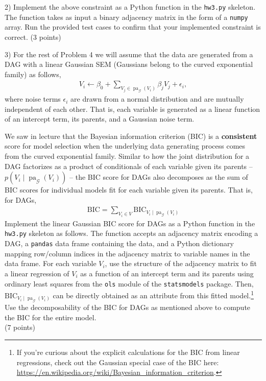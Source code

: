 \documentclass[letterpaper, 11pt]{article}
\DeclareMathOperator{\pa}{pa}
\newcommand{\G}{\mathcal{G}}
\begin{document}
2) Implement the above constraint as a Python function in the \texttt{hw3.py} skeleton. The function takes as input a binary adjacency matrix in the form of a \texttt{numpy} array. Run the provided test cases to confirm that your implemented constraint is correct. (3 points)

3) For the rest of Problem 4 we will assume that the data are generated from a DAG with a linear Gaussian SEM (Gaussians belong to the curved exponential family) as follows,
\begin{align*}
V_i \gets \beta_0 + \sum_{V_j \in \pa_\G(V_i)} \beta_j V_j + \epsilon_i,
\end{align*}
where noise terms $\epsilon_i$ are drawn from a normal distribution and are mutually independent of each other. That is, each variable is generated as a linear function of an intercept term, its parents, and a Gaussian noise term.

We saw in lecture that the Bayesian information criterion (BIC) is a \textbf{consistent} score for model selection when the underlying data generating process comes from the curved exponential family. Similar to how the joint distribution for a DAG factorizes as a product of conditionals of each variable given its parents -- $p(V_i \mid \pa_\G(V_i))$ -- the BIC score for DAGs also decomposes as the sum of BIC scores for individual models fit for each variable given its parents. That is, for DAGs,
\begin{align*}
\text{BIC} = \sum_{V_i \in V} \text{BIC}_{V_i \mid \pa_\G(V_i)}
\end{align*}
%
Implement the linear Gaussian BIC score for DAGs as a Python function in the \texttt{hw3.py} skeleton as follows. The function accepts an adjacency matrix encoding a DAG, a \texttt{pandas} data frame containing the data, and a Python dictionary mapping row/column indices in the adjacency matrix to variable names in the data frame. For each variable $V_i$, use the structure of the adjacency matrix to fit a linear regression of $V_i$ as a function of an intercept term and its parents using ordinary least squares from the \texttt{ols} module of the \texttt{statsmodels} package. Then, $\text{BIC}_{V_i \mid \pa_\G(V_i)}$ can be directly obtained as an attribute from this fitted model.\footnote{If you're curious about the explicit calculations for the BIC from linear regressions, check out the Gaussian special case of the BIC here: \url{https://en.wikipedia.org/wiki/Bayesian_information_criterion}.} Use the decomposability of the BIC for DAGs as mentioned above to compute the BIC for the entire model. \\(7 points)
\end{document}
